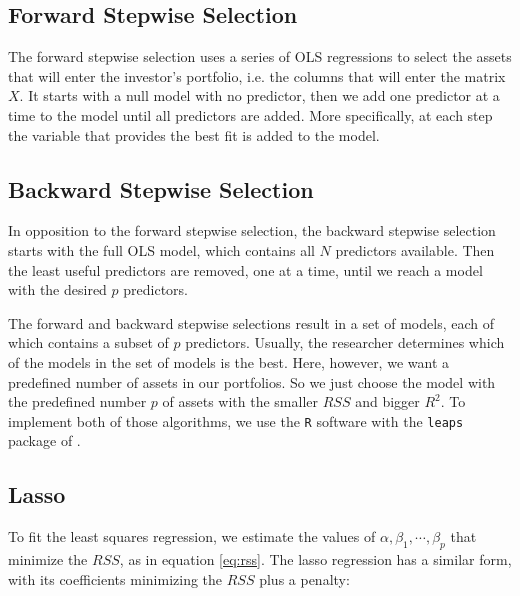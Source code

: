 \documentclass[12pt,oneside,a4paper]{memoir}
\begin{document}

\subsection{Forward Stepwise Selection}

The forward stepwise selection uses a series of OLS regressions to select the assets that will enter the investor's portfolio, i.e. the columns that will enter the matrix $X$.
It starts with a null model with no predictor, then we add one predictor at a time to the model until all predictors are added.
More specifically, at each step the variable that provides the best fit is added to the model.


\subsection{Backward Stepwise Selection}

In opposition to the forward stepwise selection, the backward stepwise selection starts with the full OLS model, which contains all $N$ predictors available.
Then the least useful predictors are removed, one at a time, until we reach a model with the desired $p$ predictors.


The forward and backward stepwise selections result in a set of models, each of which contains a subset of $p$ predictors.
Usually, the researcher determines which of the models in the set of models is the best.
Here, however, we want a predefined number of assets in our portfolios.
So we just choose the model with the predefined number $p$ of assets with the smaller $RSS$ and bigger $R^2$.
To implement both of those algorithms, we  use the \texttt{R} software \cite{R} with the \texttt{leaps} package of .

\subsection{Lasso}

To fit the least squares regression, we estimate the values of $\alpha, \beta_1, \cdots, \beta_p$ that minimize the $RSS$, as in equation \eqref{eq:rss}.
The lasso regression has a similar form, with its coefficients minimizing the $RSS$ plus a penalty: 
\end{document}
